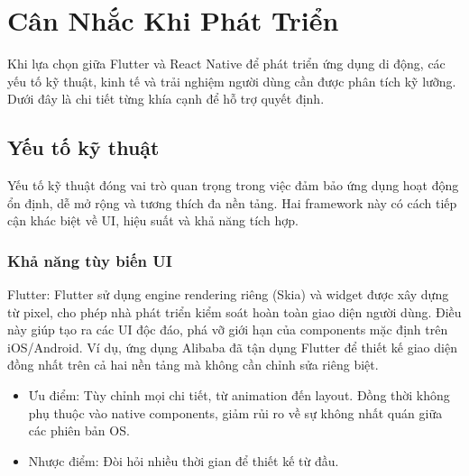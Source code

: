\section{Cân Nhắc Khi Phát Triển}

\begin{flushleft}
  \hspace*{0.8cm}Khi lựa chọn giữa Flutter và React Native để phát triển ứng dụng di động, các yếu tố kỹ thuật, kinh tế và trải nghiệm người dùng cần được phân tích kỹ lưỡng. Dưới đây là chi tiết từng khía cạnh để hỗ trợ quyết định.
\end{flushleft}

\subsection{Yếu tố kỹ thuật}
\renewcommand{\labelitemi}{--}    
    \begin{flushleft}
        \hspace*{0.8cm}Yếu tố kỹ thuật đóng vai trò quan trọng trong việc đảm bảo ứng dụng hoạt động ổn định, dễ mở rộng và tương thích đa nền tảng. Hai framework này có cách tiếp cận khác biệt về UI, hiệu suất và khả năng tích hợp.
    \end{flushleft}
    \subsubsection{Khả năng tùy biến UI}
    \begin{flushleft}
      \hspace*{0.8cm}Flutter: Flutter sử dụng engine rendering riêng (Skia) và widget được xây dựng từ pixel, cho phép nhà phát triển kiểm soát hoàn toàn giao diện người dùng. Điều này giúp tạo ra các UI độc đáo, phá vỡ giới hạn của components mặc định trên iOS/Android. Ví dụ, ứng dụng Alibaba đã tận dụng Flutter để thiết kế giao diện đồng nhất trên cả hai nền tảng mà không cần chỉnh sửa riêng biệt.
      \setlength{\leftmargini}{1.5cm}
      \begin{itemize}
        \item Ưu điểm: Tùy chỉnh mọi chi tiết, từ animation đến layout. Đồng thời không phụ thuộc vào native components, giảm rủi ro về sự không nhất quán giữa các phiên bản OS.
        \item Nhược điểm: Đòi hỏi nhiều thời gian để thiết kế từ đầu.
      \end{itemize}
    \end{flushleft}

